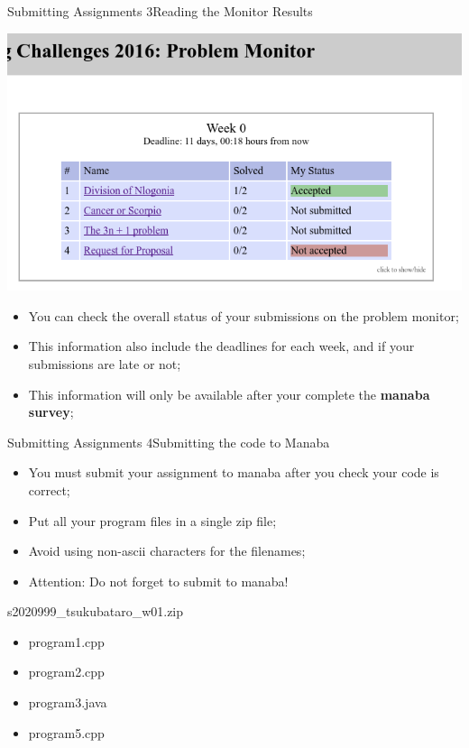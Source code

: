 \begin{frame}{Submitting Assignments 3}{Reading the Monitor Results}
  \begin{center}
    \includegraphics[width=.5\textwidth]{img/monitorpage}
  \end{center}
  \bigskip
  \begin{itemize}
    \item You can check the overall status of your submissions on the
    problem monitor;
    \medskip
    \item This information also include the deadlines for each week, and
    if your submissions are late or not;
    \medskip
    \item This information will only be available after your complete the
    {\bf manaba survey};
  \end{itemize}
\end{frame}

\begin{frame}{Submitting Assignments 4}{Submitting the code to Manaba}
  \begin{itemize}
    \item You must submit your assignment to manaba after you check your code
    is correct;
    \item Put all your program files in a single zip file;
    \item Avoid using non-ascii characters for the filenames;
    \item \alert{Attention:} Do not forget to submit to manaba!
  \end{itemize}
  \bigskip

  \begin{block}{s2020999\_tsukubataro\_w01.zip}
    \begin{itemize}
      \item program1.cpp
      \item program2.cpp
      \item program3.java
      \item program5.cpp
    \end{itemize}
  \end{block}
\end{frame}

